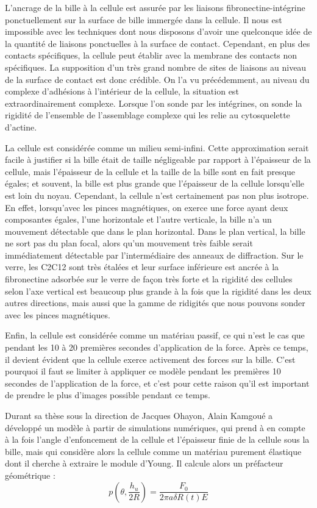 	 L'ancrage de la bille à la cellule est assurée par les liaisons fibronectine-intégrine ponctuellement sur la surface de bille immergée dans la cellule. Il nous est impossible avec les techniques dont nous disposons d'avoir une quelconque idée de la quantité de liaisons ponctuelles à la surface de contact. Cependant, en plus des contacts spécifiques, la cellule peut établir avec la membrane des contacts non spécifiques. La supposition d'un très grand nombre de sites de liaisons au niveau de la surface de contact est donc crédible. On l'a vu précédemment, au niveau du complexe d'adhésions à l'intérieur de la cellule, la situation est extraordinairement complexe. Lorsque l'on sonde par les intégrines, on sonde la rigidité de l'ensemble de l'assemblage complexe qui les relie au cytosquelette d'actine. 
	
	La cellule est considérée comme un milieu semi-infini. 
	Cette approximation serait facile à justifier si la bille était de taille négligeable par rapport à l'épaisseur de la cellule, mais l'épaisseur de la cellule et la taille de la bille sont en fait presque égales; et souvent, la bille est plus grande que l'épaisseur de la cellule lorsqu'elle est loin du noyau. 
	Cependant, la cellule n'est certainement pas non plus isotrope. 
	En effet, lorsqu'avec les pinces magnétiques, on exerce une force ayant deux composantes égales, l'une horizontale et l'autre verticale, la bille n'a un mouvement détectable que dans le plan horizontal. 
	Dans le plan vertical, la bille ne sort pas du plan focal, alors qu'un mouvement très faible serait immédiatement détectable par l'intermédiaire des anneaux de diffraction. 
	Sur le verre, les C2C12 sont très étalées et leur surface inférieure est ancrée à la fibronectine adsorbée sur le verre de façon très forte et la rigidité des cellules selon l'axe vertical est beaucoup plus grande à la fois que la rigidité dans les deux autres directions, mais aussi que la gamme de ridigités que nous pouvons sonder avec les pinces magnétiques. 
	
	Enfin, la cellule est considérée comme un matériau passif, ce qui n'est le cas que pendant les 10 à 20 premières secondes d'application de la force. 
	Après ce temps, il devient évident que la cellule exerce activement des forces sur la bille. 
	C'est pourquoi il faut se limiter à appliquer ce modèle pendant les premières 10 secondes de l'application de la force, et c'est pour cette raison qu'il est important de prendre le plus d'images possible pendant ce temps. 
	
	Durant sa thèse sous la direction de Jacques Ohayon, Alain Kamgoué a développé un modèle à partir de simulations numériques, qui prend à en compte à la fois l'angle d'enfoncement de la cellule et l'épaisseur finie de la cellule sous la bille, mais qui considère alors la cellule comme un matériau purement élastique dont il cherche à extraire le module d'Young. Il calcule alors un préfacteur géométrique : 
$$ p(\theta,\frac{h_u}{2R})=\frac{ F_0}{2 \pi a \delta R(t) E} $$

